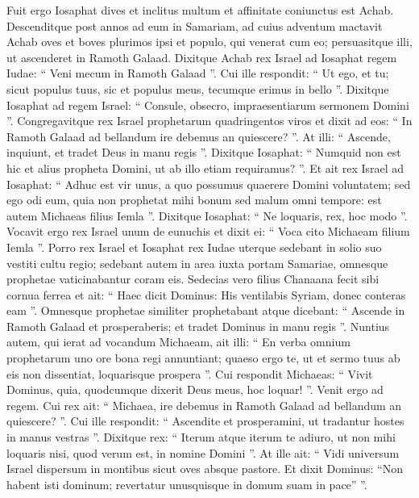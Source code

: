 \begin{biblechapter}
\begin{biblechapter}
\begin{biblechapter}
\begin{biblechapter}
\begin{biblechapter}
\begin{biblechapter}
\begin{biblechapter}
\begin{biblechapter}
\begin{biblechapter}
\begin{biblechapter}
\begin{biblechapter}
\begin{biblechapter}
\begin{biblechapter}
\begin{biblechapter}
\begin{biblechapter}
\begin{biblechapter}
\begin{biblechapter}
\begin{biblechapter}
\verse Fuit ergo Iosaphat dives et inclitus multum et affinitate coniunctus est Achab. 
\verse Descenditque post annos ad eum in Samariam, ad cuius adventum mactavit Achab oves et boves plurimos ipsi et populo, qui venerat cum eo; persuasitque illi, ut ascenderet in Ramoth Galaad. 
\verse Dixitque Achab rex Israel ad Iosaphat regem Iudae: “ Veni mecum in Ramoth Galaad ”. Cui ille respondit: “ Ut ego, et tu; sicut populus tuus, sic et populus meus, tecumque erimus in bello ”.
 \verse Dixitque Iosaphat ad regem Israel: “ Consule, obsecro, impraesentiarum sermonem Domini ”. 
\verse Congregavitque rex Israel prophetarum quadringentos viros et dixit ad eos: “ In Ramoth Galaad ad bellandum ire debemus an quiescere? ”. At illi: “ Ascende, inquiunt, et tradet Deus in manu regis ”. 
\verse Dixitque Iosaphat: “ Numquid non est hic et alius propheta Domini, ut ab illo etiam requiramus? ”. 
\verse Et ait rex Israel ad Iosaphat: “ Adhuc est vir unus, a quo possumus quaerere Domini voluntatem; sed ego odi eum, quia non prophetat mihi bonum sed malum omni tempore: est autem Michaeas filius Iemla ”. Dixitque Iosaphat: “ Ne loquaris, rex, hoc modo ”. 
\verse Vocavit ergo rex Israel unum de eunuchis et dixit ei: “ Voca cito Michaeam filium Iemla ”.
 \verse Porro rex Israel et Iosaphat rex Iudae uterque sedebant in solio suo vestiti cultu regio; sedebant autem in area iuxta portam Samariae, omnesque prophetae vaticinabantur coram eis. 
\verse Sedecias vero filius Chanaana fecit sibi cornua ferrea et ait: “ Haec dicit Dominus: His ventilabis Syriam, donec conteras eam ”. 
\verse Omnesque prophetae similiter prophetabant atque dicebant: “ Ascende in Ramoth Galaad et prosperaberis; et tradet Dominus in manu regis ”.
 \verse Nuntius autem, qui ierat ad vocandum Michaeam, ait illi: “ En verba omnium prophetarum uno ore bona regi annuntiant; quaeso ergo te, ut et sermo tuus ab eis non dissentiat, loquarisque prospera ”. 
\verse Cui respondit Michaeas: “ Vivit Dominus, quia, quodcumque dixerit Deus meus, hoc loquar! ”.
 \verse Venit ergo ad regem. Cui rex ait: “ Michaea, ire debemus in Ramoth Galaad ad bellandum an quiescere? ”. Cui ille respondit: “ Ascendite et prosperamini, ut tradantur hostes in manus vestras ”. 
\verse Dixitque rex: “ Iterum atque iterum te adiuro, ut non mihi loquaris nisi, quod verum est, in nomine Domini ”. 
\verse At ille ait:
 “ Vidi universum Israel
 dispersum in montibus
 sicut oves absque pastore.
 Et dixit Dominus:
 “Non habent isti dominum; revertatur unusquisque in domum suam in pace” ”.

\end{biblechapter}
\end{biblechapter}
\end{biblechapter}
\end{biblechapter}
\end{biblechapter}
\end{biblechapter}
\end{biblechapter}
\end{biblechapter}
\end{biblechapter}
\end{biblechapter}
\end{biblechapter}
\end{biblechapter}
\end{biblechapter}
\end{biblechapter}
\end{biblechapter}
\end{biblechapter}
\end{biblechapter}
\end{biblechapter}
